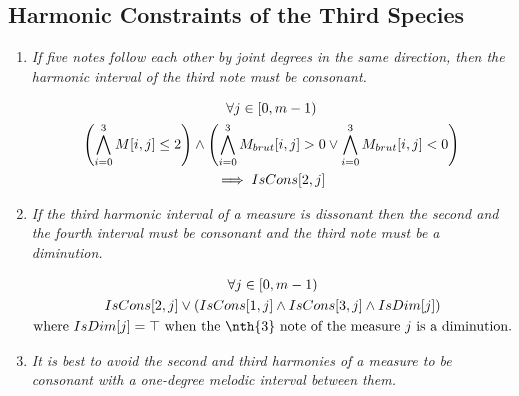 \subsection*{Harmonic Constraints of the Third Species}
\begin{enumerate}[wide, label=\bfseries 3.H\arabic*]
  \item\label{rule:fivequarters}{ \textit{If five notes follow each other by joint degrees in the same direction, then the harmonic interval of the third note must be consonant.}}

\begin{equation}
    \begin{gathered}
        \forall j \in [0, m-1)\\
        \left(
            \bigwedge_{i=0}^{3} M[i, j] \leq 2
        \right)
        \land
        \left(
            \bigwedge_{i=0}^{3} M_{brut}[i, j] > 0
            \lor
            \bigwedge_{i=0}^{3} M_{brut}[i, j] < 0
        \right)\\
        \implies IsCons[2, j]
    \end{gathered}
\end{equation}


\item\label{rule:thirddiss} {\textit{If the third harmonic interval of a measure is dissonant then the second and the fourth interval must be consonant and the third note must be a diminution.}}


\begin{equation}
    \begin{gathered}
        \forj\\
        IsCons[2, j] \lor \left( IsCons[1, j] \land IsCons[3, j] \land IsDim[j]\right)\\
        \text{where } IsDim[j]=\top \text{ when the \nth{3} note of the measure } j \text{ is a diminution.}
    \end{gathered}
\end{equation}

\item\label{rule:cambiata} {\textit{It is best to avoid the second and third harmonies of a measure to be consonant with a one-degree melodic interval between them.}}



\end{enumerate}
